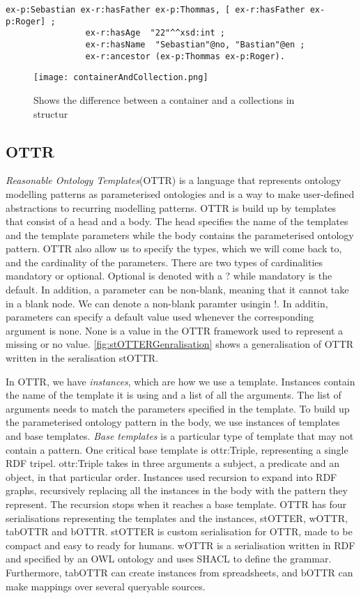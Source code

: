 \begin{lstlisting}[frame=single, language=turtle]
ex-p:Sebastian ex-r:hasFather ex-p:Thommas, [ ex-r:hasFather ex-p:Roger] ; 
                ex-r:hasAge  "22"^^xsd:int ; 
                ex-r:hasName  "Sebastian"@no, "Bastian"@en ;
                ex-r:ancestor (ex-p:Thommas ex-p:Roger).
\end{lstlisting}

\begin{figure}
    \centering
    \texttt{[image: containerAndCollection.png]}
    \caption{Shows the difference between a container and a collections in structur}
    \label{fig:containerAndCollection}
\end{figure}

\subsection{OTTR}
\emph{Reasonable Ontology Templates}(OTTR) is a language that represents ontology modelling patterns as parameterised ontologies and is a way to make user-defined abstractions to recurring modelling patterns. OTTR is build up by templates that consist of a head and a body. The head specifies the name of the templates and the template parameters while the body contains the parameterised ontology pattern. OTTR also allow us to specify the types, which we will come back to, and the cardinality of the parameters. There are two types of cardinalities mandatory or optional. Optional is denoted with a ? while mandatory is the default. In addition, a parameter can be non-blank, meaning that it cannot take in a blank node. We can denote a non-blank paramter usingin !. In additin, parameters can specify a default value used whenever the corresponding argument is none. None is a value in the OTTR framework used to represent a missing or no value. \autoref{fig:stOTTERGenralisation} shows a generalisation of OTTR written in the seralisation stOTTR.

\para
In OTTR, we have \emph{instances}, which are how we use a template. Instances contain the name of the template it is using and a list of all the arguments. The list of arguments needs to match the parameters specified in the template.  To build up the parameterised ontology pattern in the body, we use instances of templates and base templates. \emph{Base templates} is a particular type of template that may not contain a pattern. One critical base template is ottr:Triple, representing a single RDF tripel. ottr:Triple takes in three arguments a subject, a predicate and an object, in that particular order. Instances used recursion to expand into RDF graphs, recursively replacing all the instances in the body with the pattern they represent. The recursion stops when it reaches a base template. OTTR has four serialisations representing the templates and the instances, stOTTER, wOTTR, tabOTTR and bOTTR. stOTTER is custom serialisation for OTTR, made to be compact and easy to ready for humans. wOTTR is a serialisation written in RDF and specified by an OWL ontology and uses SHACL to define the grammar. Furthermore, tabOTTR can create instances from spreadsheets, and bOTTR can make mappings over several queryable sources. 


